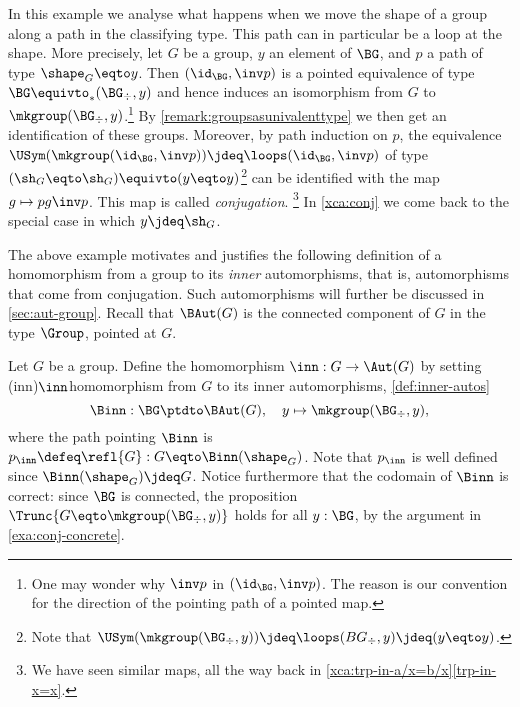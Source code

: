 \begin{example}
\label{exa:conj-concrete}
 In this example we analyse what happens when we move
 the shape of a group along a path in the classifying type. 
 This path can in particular be a loop at the shape. More precisely,
 let $G$ be a group, $y$ an element of $\BG$, and $p$ a path of 
 type $\shape_G\eqto y$.
 Then $(\id_\BG,\inv p)$ is a pointed equivalence of type 
 $\BG \equivto_* (\BG_\div , y)$ and hence induces an isomorphism 
 from $G$ to $\mkgroup(\BG_\div , y)$.\footnote{%
 One may wonder why $\inv p$ in $(\id_\BG,\inv p)$.
 The reason is our convention for the direction of the
 pointing path of a pointed map.}
 By \cref{remark:groupsasunivalenttype} we then get an 
 identification of these groups.
 Moreover, by path induction on $p$, the equivalence
 $\USym(\mkgroup(\id_\BG,\inv p))\jdeq\loops(\id_\BG,\inv p)$ 
 of type $(\sh_G\eqto\sh_G)\equivto(y\eqto y)$\footnote{%
 Note that $\USym(\mkgroup(\BG_\div,y)) \jdeq 
 \loops(BG_\div,y) \jdeq (y\eqto y)$.}
 can be identified with the map $g \mapsto p g \inv p$.
 This map is called \emph{conjugation}.%
 \footnote{We have seen similar maps, \eg all the way back in 
 \cref{xca:trp-in-a/x=b/x}\ref{trp-in-x=x}.}
 In \cref{xca:conj} we come back to the special case in which $y\jdeq\sh_G$.
\end{example}

The above example motivates and justifies the following definition of
a homomorphism from a group to its \emph{inner} automorphisms, that is, 
automorphisms that come from conjugation.
Such automorphisms will further be discussed in \cref{sec:aut-group}.
Recall that $\BAut(G)$ is the connected component of $G$ in the type 
$\Group$, pointed at $G$.
 
\begin{definition}\label{def:inner-autos}
Let $G$ be a group. Define the homomorphism $\inn: G \to \Aut(G)$ by setting
\glossary(inn){$\protect\inn$}{homomorphism from $G$ to its inner automorphisms,
\cref{def:inner-autos}}
\begin{displaymath}
  \Binn : \BG \ptdto \BAut(G), \quad y \mapsto \mkgroup(\BG_\div , y),
\end{displaymath}
where the path pointing $\Binn$ is $p_{\inn} \defeq \refl{G} :  G \eqto \Binn (\shape_G)$.
Note that $p_{\inn}$ is well defined since $\Binn (\shape_G) \jdeq G$.
Notice furthermore that the codomain of $\Binn$ is correct: since $\BG$ is connected, 
the proposition $\Trunc{G \eqto \mkgroup(\BG_\div , y)}$ holds for all $y:\BG$, 
by the argument in \cref{exa:conj-concrete}.
\end{definition}

